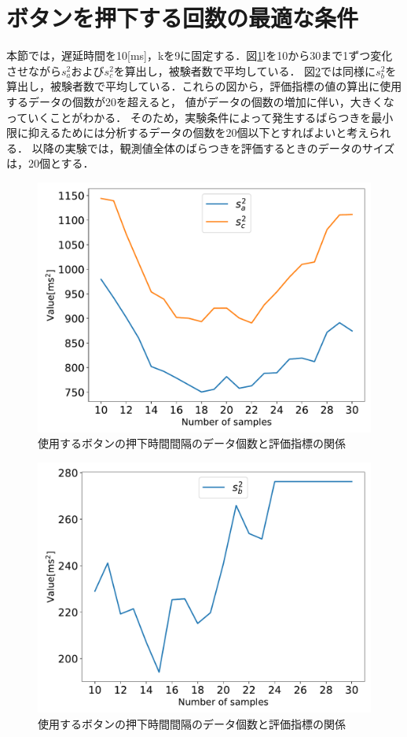 \section{ボタンを押下する回数の最適な条件}
本節では，遅延時間を10[ms]，kを9に固定する．図\ref{fig:NumberofSamples_Sa_Sc}lを10から30まで1ずつ変化させながら$s^2_{a}$および$s^2_{c}$を算出し，被験者数で平均している．
図\ref{fig:Numberofsamples_Sb}では同様に$s^2_{b}$を算出し，被験者数で平均している．これらの図から，評価指標の値の算出に使用するデータの個数が20を超えると，
値がデータの個数の増加に伴い，大きくなっていくことがわかる．
そのため，実験条件によって発生するばらつきを最小限に抑えるためには分析するデータの個数を20個以下とすればよいと考えられる．
以降の実験では，観測値全体のばらつきを評価するときのデータのサイズは，20個とする．
\begin{figure}[bt]
  \centering
  \includegraphics[scale=0.6]{figures/Yobi/Var/NumberOfSamples_varSaSc.pdf}
  \caption{使用するボタンの押下時間間隔のデータ個数と評価指標の関係}
  \label{fig:NumberofSamples_Sa_Sc}
\end{figure}
\begin{figure}[bt]
  \centering
  \includegraphics[scale=0.6]{figures/Yobi/Var/NumberOfSamples_varSb.pdf}
  \caption{使用するボタンの押下時間間隔のデータ個数と評価指標の関係}
  \label{fig:Numberofsamples_Sb}
\end{figure}

